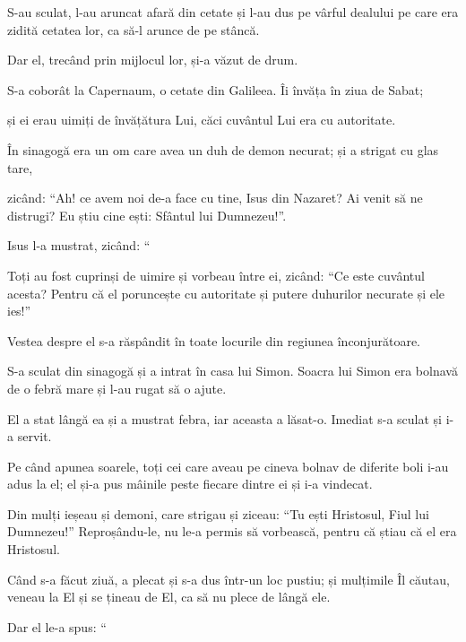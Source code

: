 {S-au sculat, l-au aruncat afară din cetate și l-au dus pe vârful dealului pe care era zidită cetatea lor, ca să-l arunce de pe stâncă.

Dar el, trecând prin mijlocul lor, și-a văzut de drum.


\par }{\PP {}S-a coborât la Capernaum, o cetate din Galileea. Îi învăța în ziua de Sabat;

și ei erau uimiți de învățătura Lui, căci cuvântul Lui era cu autoritate.

În sinagogă era un om care avea un duh de demon necurat; și a strigat cu glas tare,

zicând: “Ah! ce avem noi de-a face cu tine, Isus din Nazaret? Ai venit să ne distrugi? Eu știu cine ești: Sfântul lui Dumnezeu!”.


\par }{\PP {}Isus l-a mustrat, zicând: “{}


\par }{\PP {}Toți au fost cuprinși de uimire și vorbeau între ei, zicând: “Ce este cuvântul acesta? Pentru că el poruncește cu autoritate și putere duhurilor necurate și ele ies!”

Vestea despre el s-a răspândit în toate locurile din regiunea înconjurătoare.


\par }{\PP {}S-a sculat din sinagogă și a intrat în casa lui Simon. Soacra lui Simon era bolnavă de o febră mare și l-au rugat să o ajute.

El a stat lângă ea și a mustrat febra, iar aceasta a lăsat-o. Imediat s-a sculat și i-a servit.

Pe când apunea soarele, toți cei care aveau pe cineva bolnav de diferite boli i-au adus la el; el și-a pus mâinile peste fiecare dintre ei și i-a vindecat.

Din mulți ieșeau și demoni, care strigau și ziceau: “Tu ești Hristosul, Fiul lui Dumnezeu!” Reproșându-le, nu le-a permis să vorbească, pentru că știau că el era Hristosul.


\par }{\PP {}Când s-a făcut ziuă, a plecat și s-a dus într-un loc pustiu; și mulțimile Îl căutau, veneau la El și se țineau de El, ca să nu plece de lângă ele.

Dar el le-a spus: “{}

}
